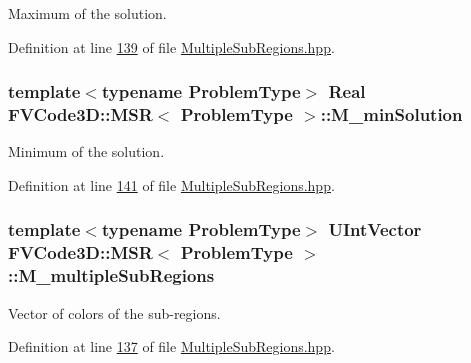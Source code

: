 Maximum of the solution. 



Definition at line \hyperlink{MultipleSubRegions_8hpp_source_l00139}{139} of file \hyperlink{MultipleSubRegions_8hpp_source}{Multiple\+Sub\+Regions.\+hpp}.

\subsubsection[{\texorpdfstring{M\+\_\+min\+Solution}{M_minSolution}}]{\setlength{\rightskip}{0pt plus 5cm}template$<$typename Problem\+Type$>$ {\bf Real} {\bf F\+V\+Code3\+D\+::\+M\+SR}$<$ Problem\+Type $>$\+::M\+\_\+min\+Solution\hspace{0.3cm}{\ttfamily [private]}}\hypertarget{classFVCode3D_1_1MSR_a6e8eb6a0513e4b46241950b8ee2b7212}{}\label{classFVCode3D_1_1MSR_a6e8eb6a0513e4b46241950b8ee2b7212}


Minimum of the solution. 



Definition at line \hyperlink{MultipleSubRegions_8hpp_source_l00141}{141} of file \hyperlink{MultipleSubRegions_8hpp_source}{Multiple\+Sub\+Regions.\+hpp}.

\subsubsection[{\texorpdfstring{M\+\_\+multiple\+Sub\+Regions}{M_multipleSubRegions}}]{\setlength{\rightskip}{0pt plus 5cm}template$<$typename Problem\+Type$>$ {\bf U\+Int\+Vector} {\bf F\+V\+Code3\+D\+::\+M\+SR}$<$ Problem\+Type $>$\+::M\+\_\+multiple\+Sub\+Regions\hspace{0.3cm}{\ttfamily [private]}}\hypertarget{classFVCode3D_1_1MSR_a38cba0138e4ebd055d47b3d9d9d32623}{}\label{classFVCode3D_1_1MSR_a38cba0138e4ebd055d47b3d9d9d32623}


Vector of colors of the sub-\/regions. 



Definition at line \hyperlink{MultipleSubRegions_8hpp_source_l00137}{137} of file \hyperlink{MultipleSubRegions_8hpp_source}{Multiple\+Sub\+Regions.\+hpp}.

